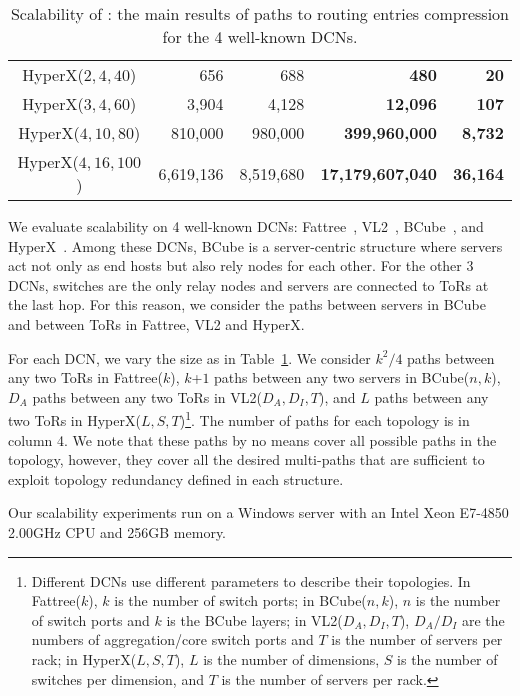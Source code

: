 \begin{table}[t]
{\begin{tabular}{|c|r|r|r|r|}
 HyperX($2,4,40$)&   656      &       688      &    \textbf{480}   &   \textbf{20}       \\
 HyperX($3,4,60$)&   3,904      &       4,128      & \textbf{12,096}   &   \textbf{107}       \\
 HyperX($4,10,80$)&  810,000  &  980,000   & \textbf{399,960,000}     &    \textbf{8,732} \\
 HyperX($4,16,100$)&   6,619,136  &   8,519,680   &\textbf{17,179,607,040}   &    \textbf{36,164} \\
\hline
\end{tabular}
}
\caption{Scalability of \sys: the main results of paths to routing entries compression for the 4 well-known DCNs.}\label{table:result}
\end{table}

 We evaluate \sys scalability on 4 well-known DCNs: Fattree~\cite{fattree}, VL2~\cite{vl2}, BCube~\cite{bcube}, and HyperX~\cite{hyperx}. Among these DCNs, BCube is a server-centric structure where servers act not only as end hosts but also rely nodes for each other. For the other 3 DCNs, switches are the only relay nodes and servers are connected to ToRs at the last hop. For this reason, we consider the paths between servers in BCube and between ToRs in Fattree, VL2 and HyperX.

For each DCN, we vary the size as in Table~\ref{table:result}. We consider $k^2/4$ paths between any two ToRs in Fattree($k$), $k$+$1$ paths between any two servers in BCube($n,k$), $D_A$ paths between any two ToRs in VL2($D_A, D_I, T$), and $L$ paths between any two ToRs in HyperX($L,S,T$)\footnote{Different DCNs use different parameters to describe their topologies. In Fattree($k$), $k$ is the number of switch ports; in BCube($n,k$), $n$ is the number of switch ports and $k$ is the BCube layers; in VL2($D_A, D_I, T$), $D_A/D_I$ are the numbers of aggregation/core switch ports and $T$ is the number of servers per rack; in HyperX($L,S,T$), $L$ is the number of dimensions, $S$ is the number of switches per dimension, and $T$ is the number of servers per rack.}. The number of paths for each topology is in column 4. We note that these paths by no means cover all possible paths in the topology, however, they cover all the desired multi-paths that are sufficient to exploit topology redundancy defined in each structure.

Our scalability experiments run on a Windows server with an Intel Xeon E7-4850 2.00GHz CPU and 256GB memory.

